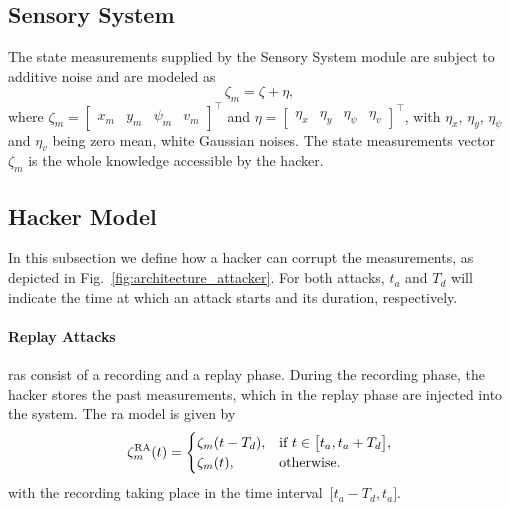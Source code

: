 \subsection{Sensory System}
\label{sub_sec:Sensory_system}
%
The state measurements supplied by the Sensory System module are subject to additive noise and are modeled as 
\begin{equation}\label{eq:sensor_measurements}
	\zeta_m = \zeta + \eta,
\end{equation}
%	
where $\zeta_m=\begin{bmatrix} x_m & y_m & \psi_m & v_m \end{bmatrix}^\top$ and $\eta=\begin{bmatrix} \eta_x & \eta_y & \eta_\psi & \eta_v \end{bmatrix}^\top$, with $\eta_x$, $\eta_y$, $\eta_{\psi}$ and $\eta_v$ being zero mean, white Gaussian noises. The state measurements vector $\zeta_m$ is the whole knowledge accessible by the hacker. 

\subsection{Hacker Model}
\label{sub_sec:attacker_model}
%
In this subsection we define how a hacker can corrupt the measurements, as depicted in Fig.~\ref{fig:architecture_attacker}. For both attacks, $t_a$ and $T_d$ will indicate the time at which an attack starts and its duration, respectively.
%
\paragraph{Replay Attacks}
\glspl{ra} consist of a recording and a replay phase. During the recording phase, the hacker stores the past measurements, which in the replay phase are injected into the system. The \gls{ra} model is given by~\cite{teixeira2015secure}
%
\begin{equation} \label{eq:replay_model}
	\zeta^{\rm RA}_{m}(t) = \begin{cases}  \zeta_m(t-T_d), & \mbox{if } t \in \big[t_a,t_a+ T_d\big], \\ \zeta_m(t), & \mbox{otherwise}.  \end{cases}
\end{equation} 
%	
with the recording taking place in the time interval~\mbox{$\big[t_a-T_d,t_a\big]$}.
%
